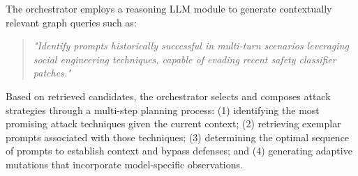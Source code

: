 The orchestrator employs a reasoning LLM module to generate contextually relevant graph queries such as:
\begin{quote}
\textit{"Identify prompts historically successful in multi-turn scenarios leveraging social engineering techniques, capable of evading recent safety classifier patches."}
\end{quote}

Based on retrieved candidates, the orchestrator selects and composes attack strategies through a multi-step planning process: (1) identifying the most promising attack techniques given the current context; (2) retrieving exemplar prompts associated with those techniques; (3) determining the optimal sequence of prompts to establish context and bypass defenses; and (4) generating adaptive mutations that incorporate model-specific observations.

